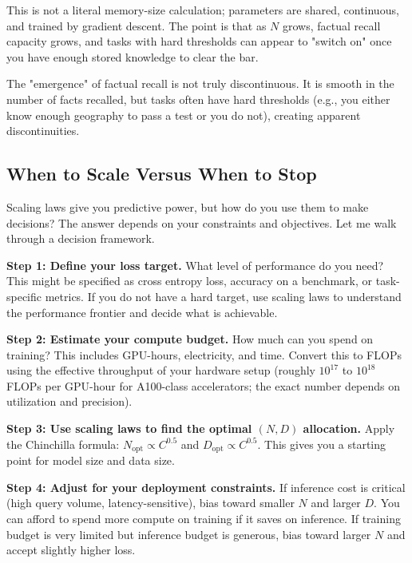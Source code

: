 \begin{examplebox}
This is not a literal memory-size calculation; parameters are shared, continuous, and trained by gradient descent. The point is that as $N$ grows, factual recall capacity grows, and tasks with hard thresholds can appear to "switch on" once you have enough stored knowledge to clear the bar.

\vspace{0.5em}

The "emergence" of factual recall is not truly discontinuous. It is smooth in the number of facts recalled, but tasks often have hard thresholds (e.g., you either know enough geography to pass a test or you do not), creating apparent discontinuities.
\end{examplebox}

\vspace{1.5em}

\subsection{When to Scale Versus When to Stop}

Scaling laws give you predictive power, but how do you use them to make decisions? The answer depends on your constraints and objectives. Let me walk through a decision framework.

\textbf{Step 1: Define your loss target.} What level of performance do you need? This might be specified as cross entropy loss, accuracy on a benchmark, or task-specific metrics. If you do not have a hard target, use scaling laws to understand the performance frontier and decide what is achievable.

\textbf{Step 2: Estimate your compute budget.} How much can you spend on training? This includes GPU-hours, electricity, and time. Convert this to FLOPs using the effective throughput of your hardware setup (roughly $10^{17}$ to $10^{18}$ FLOPs per GPU-hour for A100-class accelerators; the exact number depends on utilization and precision).

\textbf{Step 3: Use scaling laws to find the optimal $(N, D)$ allocation.} Apply the Chinchilla formula: $N_{\text{opt}} \propto C^{0.5}$ and $D_{\text{opt}} \propto C^{0.5}$. This gives you a starting point for model size and data size.

\textbf{Step 4: Adjust for your deployment constraints.} If inference cost is critical (high query volume, latency-sensitive), bias toward smaller $N$ and larger $D$. You can afford to spend more compute on training if it saves on inference. If training budget is very limited but inference budget is generous, bias toward larger $N$ and accept slightly higher loss.


